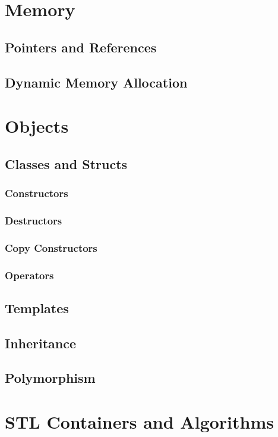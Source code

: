 \documentclass[11pt,fancy,authoryear]{elegantbook}
\begin{document}
\chapter{Memory}

\section{Pointers and References}

\section{Dynamic Memory Allocation}

\chapter{Objects}

\section{Classes and Structs}

\subsection{Constructors}

\subsection{Destructors}

\subsection{Copy Constructors}

\subsection{Operators}

\section{Templates}

\section{Inheritance}

\section{Polymorphism}

\chapter{STL Containers and Algorithms}
\end{document}
